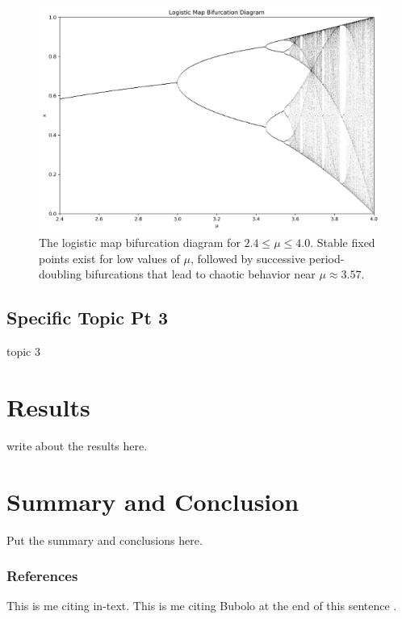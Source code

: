 \documentclass{aastex631}
\begin{document}
\begin{figure}[H]
    \centering
    \includegraphics[width=0.9\linewidth]{bifurcation.png}
    \caption{The logistic map bifurcation diagram for $2.4\leq \mu \leq 4.0$. Stable fixed points exist for low values of $\mu$, followed by successive period-doubling bifurcations that lead to chaotic behavior near $\mu\approx 3.57$.}
    \label{fig:bifurcation}
\end{figure}


\subsection{Specific Topic Pt 3} \label{sec:subtopic3}
topic 3

\section{Results} \label{sec:results}
write about the results here.


\section{Summary and Conclusion} \label{sec:summary}
Put the summary and conclusions here.


\subsubsection{References}
This is me citing \citet{boeing} in-text. This is me citing Bubolo at the end of this sentence \citep{bubolo}.

\newpage

%

\end{document}
